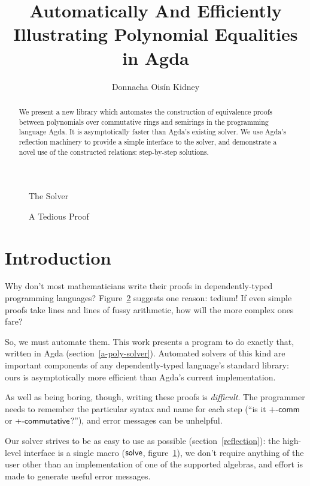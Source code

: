 \documentclass[draft, twocolumn]{article}
\author{Donnacha Oisín Kidney}
\title{Automatically And Efficiently Illustrating Polynomial Equalities in Agda}
\theoremstyle{definition}
\theoremstyle{definition}
\begin{document}
\maketitle
\begin{figure}
  \caption{The Solver}
  \label{the-solver}
\end{figure}
\begin{figure}
  \centering
  \caption{A Tedious Proof}
  \label{ring-proof}
\end{figure}
\begin{abstract}
  We present a new library which automates the construction of equivalence
  proofs between polynomials over commutative rings and semirings in the
  programming language Agda\cite{norell_dependently_2008}. It is asymptotically
  faster than Agda's existing solver. We use Agda's reflection machinery to
  provide a simple interface to the solver, and demonstrate a novel use of the
  constructed relations: step-by-step solutions.
\end{abstract}
\tableofcontents
\section{Introduction}
Why don't most mathematicians write their proofs in dependently-typed
programming languages? Figure~\ref{ring-proof} suggests one reason: tedium!
If even simple proofs take lines and lines of fussy arithmetic, how will the
more complex ones fare?

So, we must automate them. This work presents a program to do exactly that,
written in Agda (section~\ref{a-poly-solver}). Automated solvers of this kind
are important components of any dependently-typed language's standard library:
ours is asymptotically more efficient than Agda's current implementation. 

As well as being boring, though, writing these proofs is \emph{difficult}. The
programmer needs to remember the particular syntax and name for each step (``is
it \(\AgdaFunction{+-comm}\) or \(\AgdaFunction{+-commutative}\)?''), and error
messages can be unhelpful.

Our solver strives to be as easy to use as possible (section~\ref{reflection}):
the high-level interface is a single macro (\(\AgdaMacro{solve}\),
figure~\ref{the-solver}), we don't require anything of the user other than an
implementation of one of the supported algebras, and effort is made to generate
useful error messages.
\end{document}
